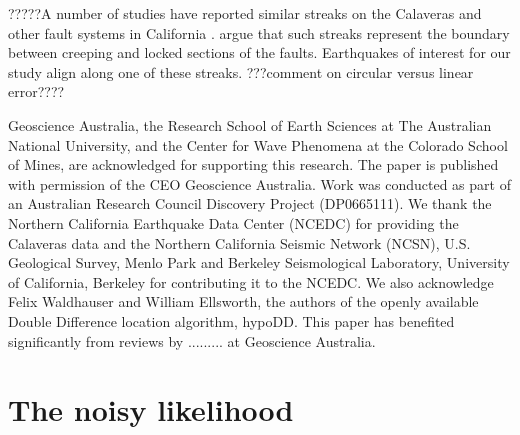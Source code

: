 \documentclass[extra]{gji}
\begin{document}
?????A number of studies have reported similar streaks on the
Calaveras and other fault systems in California
\citep{dr_Rubin99a,dr_Waldhauser99a, dr_Waldhauser02a, dr_Schaff02a,
dr_Waldhauser04a}. \citet{dr_Rubinstein07a} argue that such streaks
represent the boundary between creeping and locked sections of the
faults. Earthquakes of interest for  our study align along one of
these streaks. ???comment on circular versus linear error????


\begin{acknowledgments}
Geoscience Australia, the Research School of Earth Sciences at The
Australian National University, and the Center for Wave Phenomena at
the Colorado School of Mines, are acknowledged for supporting this
research. The paper is published with permission of the CEO
Geoscience Australia. Work was conducted as part of an Australian
Research Council Discovery Project (DP0665111). We thank the
Northern California Earthquake Data Center (NCEDC) for providing the
Calaveras data and the Northern California Seismic Network (NCSN),
U.S. Geological Survey, Menlo Park and Berkeley Seismological
Laboratory, University of California, Berkeley for contributing it
to the NCEDC. We also acknowledge Felix Waldhauser and William
Ellsworth, the authors of the openly available Double Difference
location algorithm, hypoDD. This paper has benefited significantly
from reviews by ......... at Geoscience Australia.
\end{acknowledgments}







\appendix

\section{The noisy likelihood}
\label{sec-Appendix-noisylikelihood}
\end{document}
